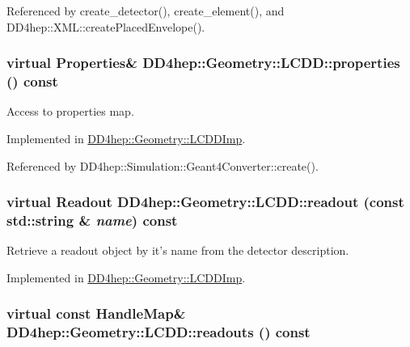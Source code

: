 Referenced by create\_\-detector(), create\_\-element(), and DD4hep::XML::createPlacedEnvelope().\hypertarget{class_d_d4hep_1_1_geometry_1_1_l_c_d_d_a15fac6166c5a16968cf9f60b515f4125}{
\subsubsection[{properties}]{\setlength{\rightskip}{0pt plus 5cm}virtual {\bf Properties}\& DD4hep::Geometry::LCDD::properties () const}}
\label{class_d_d4hep_1_1_geometry_1_1_l_c_d_d_a15fac6166c5a16968cf9f60b515f4125}


Access to properties map. 

Implemented in \hyperlink{class_d_d4hep_1_1_geometry_1_1_l_c_d_d_imp_a0b1b69a5950f1780233ff1f1a801a152}{DD4hep::Geometry::LCDDImp}.

Referenced by DD4hep::Simulation::Geant4Converter::create().\hypertarget{class_d_d4hep_1_1_geometry_1_1_l_c_d_d_aa29f75fba9942edd7f73226a11c9598e}{
\subsubsection[{readout}]{\setlength{\rightskip}{0pt plus 5cm}virtual {\bf Readout} DD4hep::Geometry::LCDD::readout (const std::string \& {\em name}) const}}
\label{class_d_d4hep_1_1_geometry_1_1_l_c_d_d_aa29f75fba9942edd7f73226a11c9598e}


Retrieve a readout object by it's name from the detector description. 

Implemented in \hyperlink{class_d_d4hep_1_1_geometry_1_1_l_c_d_d_imp_a0ab6375a7cb75751b8f434c06c58d3b2}{DD4hep::Geometry::LCDDImp}.\hypertarget{class_d_d4hep_1_1_geometry_1_1_l_c_d_d_a5c815f21643ebb5cce9d1d1e71772431}{
\subsubsection[{readouts}]{\setlength{\rightskip}{0pt plus 5cm}virtual const {\bf HandleMap}\& DD4hep::Geometry::LCDD::readouts () const}}
\label{class_d_d4hep_1_1_geometry_1_1_l_c_d_d_a5c815f21643ebb5cce9d1d1e71772431}



